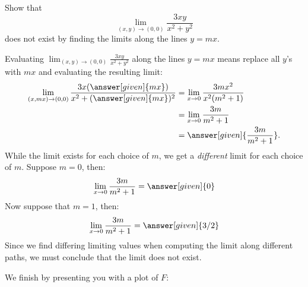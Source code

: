 \documentclass{ximera}
\begin{document}
\begin{example}
  Show that
  \[
  \lim_{(x,y)\to(0,0)} \frac{3xy}{x^2+y^2}
  \]
  does not exist by finding the limits along the lines $y=mx$.
  \begin{explanation}
    Evaluating $\lim_{(x,y)\to(0,0)} \frac{3xy}{x^2+y^2}$ along
    the lines $y=mx$ means replace all $y$'s with $mx$ and evaluating
    the resulting limit:
    \begin{align*}
      \lim_{(x,mx)\to(0,0)} \frac{3x(\answer[given]{m x})}{x^2+(\answer[given]{mx})^2} &=\lim_{x\to0} \frac{3mx^2}{x^2(m^2+1)}\\
      &= \lim_{x\to 0}\frac{3m}{m^2+1}\\
      &= \answer[given]{\frac{3m}{m^2+1}}.
    \end{align*}
    While the limit exists for each choice of $m$, we get a
    \textit{different} limit for each choice of $m$. Suppose $m=0$,
    then:
    \[
    \lim_{x\to 0}\frac{3m}{m^2+1} = \answer[given]{0}
    \]
    Now suppose that $m=1$, then:
    \[
    \lim_{x\to 0}\frac{3m}{m^2+1} = \answer[given]{3/2}
    \]
    Since we find differing limiting values when computing the limit
    along different paths, we must conclude that the limit does not
    exist.
    \begin{onlineOnly}
      We finish by presenting you with a plot of $F$:
      \begin{center}
      \end{center}
    \end{onlineOnly}
  \end{explanation}
\end{example}
\end{document}
